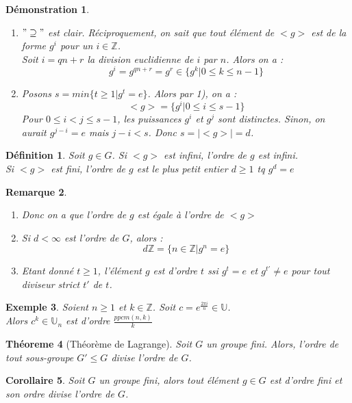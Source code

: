 \documentclass[a4paper, oneside]{report}
\theoremstyle{break}
\newtheorem{thm}{Théoreme}[section] %
\newtheorem{defi}[thm]{Définition}
\newtheorem{cor}[thm]{Corollaire}
\newtheorem{exem}[thm]{Exemple}
\newtheorem*{demo}{Démonstration}
\newtheorem{remar}[thm]{Remarque}
\newcommand{\Z}{\mathbb{Z}}
\newcommand{\U}{\mathbb{U}}
\newcommand{\displayastyle}{\displaystyle}
\begin{document}
\begin{demo}
	\begin{enumerate}
		\item $"\supseteq"$ est clair. Réciproquement, on sait que tout élément de $<g>$ est de la forme $g^i$ pour un $i \in \Z$.\\
		Soit $i=qn+r$ la division euclidienne de $i$ par $n$. Alors on a :
		$$g^i=g^{qn+r}=g^r \in \{g^k | 0\leq k \leq n-1 \}$$
		
		\item Posons $s=min\{t \geq 1 | g^t=e \}$. Alors par 1), on a :
		$$<g> = \{g^i | 0\leq i \leq s-1 \}$$
		Pour $0\leq i < j \leq s-1$, les puissances $g^i$ et $g^j$ sont distinctes. Sinon, on aurait $g^{j-i}=e$ mais $j-i<s$. Donc $s=|<g>| = d$.
	\end{enumerate}	
\end{demo}

\begin{defi}
	Soit $g\in G$. Si $<g>$ est infini, l'ordre de $g$ est infini.\\
	Si $<g>$ est fini, l'ordre de $g$ est le plus petit entier $d\geq 1$ tq $g^d=e$	
\end{defi}

\begin{remar}
	\begin{enumerate}
		\item Donc on a que l'ordre de $g$ est égale à l'ordre de $<g>$
		\item Si $d<\infty$ est l'ordre de $G$, alors :
		$$d\Z=\{n\in \Z | g^n =e \}$$
		\item Etant donné $t\geq 1$, l'élément $g$ est d'ordre $t$ ssi $g^t=e$ et $g^{t'}\neq e$ pour tout diviseur strict $t'$ de $t$.
	\end{enumerate}	
\end{remar}

\begin{exem}
	Soient $n\geq 1$ et $k\in \Z$. Soit $c=e^{\frac{2\pi i}{n}}\in \U$.\\
	Alors $c^k\in \U_n$ est d'ordre $\displayastyle\frac{ppcm(n,k)}{k}$	
\end{exem}

\begin{thm}[Théorème de Lagrange]
	Soit $G$ un groupe fini. Alors, l'ordre de tout sous-groupe $G'\leq G$ divise l'ordre de $G$.
\end{thm}

\begin{cor}
	Soit $G$ un groupe fini, alors tout élément $g\in G$ est d'ordre fini et son ordre divise l'ordre de $G$.
\end{cor}
\end{document}
